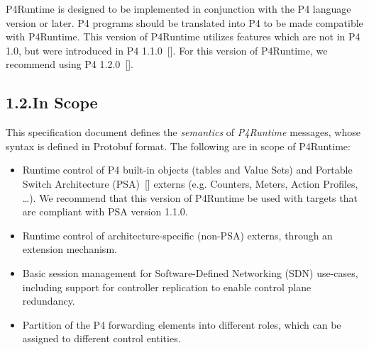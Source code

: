 \documentclass[11pt]{article}
\begin{document}
{%
\noindent{}P4Runtime is designed to be implemented in conjunction with the P4 language
version or later. P4 programs should be translated into P4 to be made
compatible with P4Runtime. This version of P4Runtime utilizes features which are
not in P4 1.0, but were introduced in P4 1.1.0~[]. For
this version of P4Runtime, we recommend using P4 1.2.0~[].%

\subsection{1.2.\hspace*{0.5em}In Scope}\label{sec-in-scope}%

\noindent{}This specification document defines the \emph{semantics} of \emph{P4Runtime} messages,
whose syntax is defined in Protobuf format. The following are in scope of
P4Runtime:%

\begin{itemize}[noitemsep,topsep=\mdcompacttopsep]%

\item{}Runtime control of P4 built-in objects (tables and Value Sets) and Portable
Switch Architecture (PSA)~[] externs (e.g. Counters, Meters, Action
Profiles, \dots{}). We recommend that this version of P4Runtime be used with
targets that are compliant with PSA version 1.1.0.%

\item{}Runtime control of architecture-specific (non-PSA) externs, through an
extension mechanism.%

\item{}Basic session management for Software-Defined Networking (SDN) use-cases,
including support for controller replication to enable control plane
redundancy.%

\item{}Partition of the P4 forwarding elements into different roles, which can be
assigned to different control entities.%


\end{itemize}}
\end{document}
